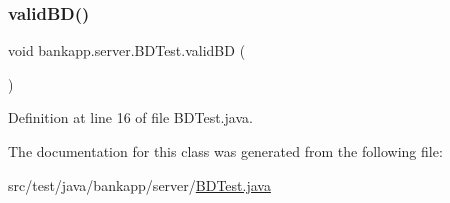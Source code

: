 \subsubsection{\texorpdfstring{valid\+B\+D()}{validBD()}}
{\footnotesize\ttfamily void bankapp.\+server.\+B\+D\+Test.\+valid\+BD (\begin{DoxyParamCaption}{ }\end{DoxyParamCaption})}



Definition at line 16 of file B\+D\+Test.\+java.



The documentation for this class was generated from the following file\+:\begin{DoxyCompactItemize}
\item 
src/test/java/bankapp/server/\hyperlink{_b_d_test_8java}{B\+D\+Test.\+java}\end{DoxyCompactItemize}

